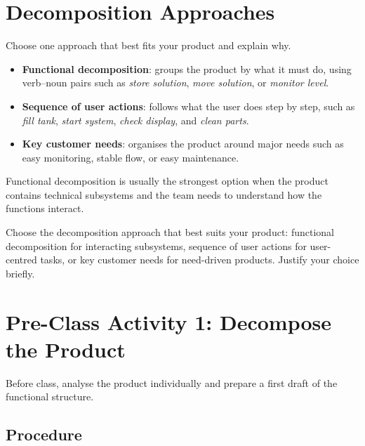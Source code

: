 \section{Decomposition Approaches}

Choose one approach that best fits your product and explain why.

\begin{itemize}
    \item \textbf{Functional decomposition}: groups the product by what it must do, using verb--noun pairs such as \textit{store solution}, \textit{move solution}, or \textit{monitor level}.
    \item \textbf{Sequence of user actions}: follows what the user does step by step, such as \textit{fill tank}, \textit{start system}, \textit{check display}, and \textit{clean parts}.
    \item \textbf{Key customer needs}: organises the product around major needs such as easy monitoring, stable flow, or easy maintenance.
\end{itemize}

Functional decomposition is usually the strongest option when the product contains technical subsystems and the team needs to understand how the functions interact.

\begin{tcolorbox}[title=Hint]
Choose the decomposition approach that best suits your product: functional decomposition for interacting subsystems, sequence of user actions for user-centred tasks, or key customer needs for need-driven products. Justify your choice briefly.
\end{tcolorbox}

\section{Pre-Class Activity 1: Decompose the Product}

Before class, analyse the product individually and prepare a first draft of the functional structure.

\subsection{Procedure}

